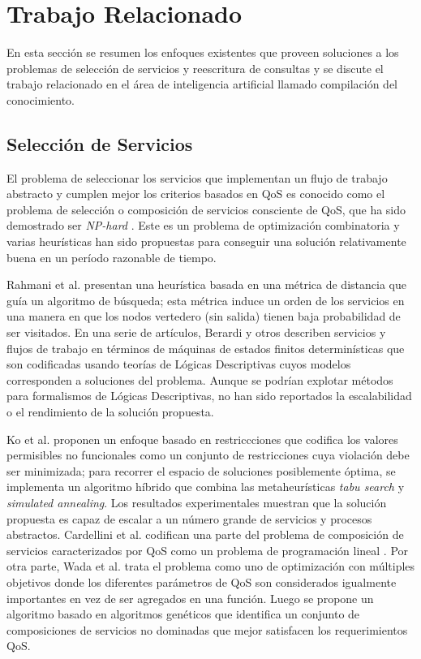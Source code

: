 \section{Trabajo Relacionado}

En esta sección se resumen los enfoques existentes que proveen soluciones
a los problemas de selección de servicios y reescritura de consultas y se
discute el trabajo relacionado en el área de inteligencia artificial llamado
compilación del conocimiento.

\subsection{Selección de Servicios}

El problema de seleccionar los servicios que implementan un flujo de trabajo
abstracto y cumplen mejor los criterios basados en QoS es conocido como el
problema de selección o composición de servicios consciente de QoS, que ha sido
demostrado ser \emph{NP-hard} \cite{Hiroshi2008}. Este es un problema de optimización
combinatoria y varias heurísticas han sido propuestas para conseguir una
solución relativamente buena en un período razonable de tiempo.

Rahmani et al. \cite{rahmani08} presentan una heurística basada en una métrica de distancia
que guía un algoritmo de búsqueda; esta métrica induce un orden de
los servicios en una manera en que los nodos vertedero (sin salida) tienen baja probabilidad
de ser visitados. En una serie de artículos, Berardi y otros \cite{berardi05,berardi08,berardi06}
describen
servicios y flujos de trabajo en términos de máquinas de estados finitos
determinísticas que son codificadas usando teorías de Lógicas Descriptivas
cuyos modelos corresponden a soluciones del problema. Aunque se podrían explotar
métodos para formalismos de Lógicas Descriptivas, no han sido reportados la
escalabilidad o el rendimiento de la solución propuesta.

Ko et al. \cite{myoung08} proponen un enfoque basado en restriccciones que codifica
los valores permisibles no funcionales como un conjunto de restricciones cuya
violación debe ser minimizada; para recorrer el espacio de soluciones
posiblemente óptima, se implementa un algoritmo híbrido que combina las
metaheurísticas \emph{tabu search} y \emph{simulated annealing}. Los resultados
experimentales muestran que la solución propuesta es capaz de escalar a un
número grande de servicios y procesos abstractos. Cardellini et al. \cite{cardellini07}
codifican una parte del problema de composición de servicios caracterizados por QoS
como un problema de programación lineal \cite{cardellini07}. Por otra parte, Wada et al.
\cite{Hiroshi2008} trata el problema como uno de optimización con múltiples objetivos donde
los diferentes parámetros de QoS son considerados igualmente importantes en vez
de ser agregados en una función. Luego se propone un algoritmo basado en
algoritmos genéticos que identifica un conjunto de composiciones de servicios
no dominadas que mejor satisfacen los requerimientos QoS.


